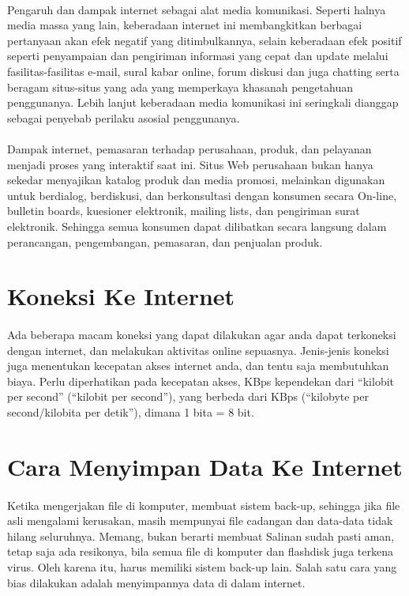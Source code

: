 \documentclass[12pt, a4paper]{article}
\begin{document}
\paragraph{} Pengaruh dan dampak internet sebagai alat media komunikasi. Seperti halnya media massa yang lain, keberadaan internet ini membangkitkan berbagai pertanyaan akan efek negatif yang ditimbulkannya, selain keberadaan efek positif seperti penyampaian dan pengiriman informasi yang cepat dan update melalui fasilitas-fasilitas e-mail, sural kabar online, forum diskusi dan juga chatting serta beragam situs-situs yang ada yang memperkaya khasanah pengetahuan penggunanya. Lebih lanjut keberadaan media komunikasi ini seringkali dianggap sebagai penyebab perilaku asosial penggunanya.
\paragraph{} Dampak internet, pemasaran terhadap perusahaan, produk, dan pelayanan menjadi proses yang interaktif saat ini. Situs Web perusahaan bukan hanya sekedar menyajikan katalog produk dan media promosi, melainkan digunakan untuk berdialog, berdiskusi, dan berkonsultasi dengan konsumen secara On-line, bulletin boards, kuesioner elektronik, mailing lists, dan pengiriman surat elektronik. Sehingga semua konsumen dapat dilibatkan secara langsung dalam perancangan, pengembangan, pemasaran, dan penjualan produk.

\section{Koneksi Ke Internet}
\paragraph{} Ada beberapa macam koneksi yang dapat dilakukan agar anda dapat terkoneksi dengan internet, dan melakukan aktivitas online sepuasnya. Jenis-jenis koneksi juga menentukan kecepatan akses internet anda, dan tentu saja membutuhkan biaya. Perlu diperhatikan pada kecepatan akses, KBps kependekan dari “kilobit per second” (“kilobit per second”), yang berbeda dari KBps (“kilobyte per second/kilobita per detik”), dimana 1 bita = 8 bit.

\section{Cara Menyimpan Data Ke Internet}
\paragraph{} Ketika mengerjakan file di komputer, membuat sistem back-up, sehingga jika file asli mengalami kerusakan, masih mempunyai file cadangan dan data-data tidak hilang seluruhnya. Memang, bukan berarti membuat Salinan sudah pasti aman, tetap saja ada resikonya, bila semua file di komputer dan flashdisk juga terkena virus. Oleh karena itu, harus memiliki sistem back-up lain. Salah satu cara yang bias dilakukan adalah menyimpannya data di dalam internet.
\end{document}
